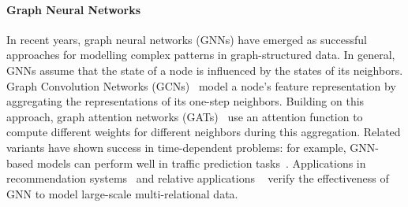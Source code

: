 \documentclass[letterpaper]{article} %
\begin{document}


\paragraph{Graph Neural Networks}
In recent years, graph neural networks (GNNs) have emerged as successful approaches for modelling complex patterns in graph-structured data.
In general, GNNs assume that the state of a node is influenced by the states of its neighbors. Graph Convolution Networks (GCNs)~\cite{gcn} model a node's feature representation by aggregating the representations of its one-step neighbors. Building on this approach, graph attention networks (GATs)~\cite{gat} use an attention function to compute different weights for different neighbors during this aggregation. 
Related variants have shown success in time-dependent problems: for example, GNN-based models can perform well in traffic prediction tasks~\cite{traffic_2,traffic_1}. Applications in recommendation systems~\cite{lim2020stp,relationalgcn} and relative applications ~\cite{wang2020detecting} verify the effectiveness of GNN to model large-scale multi-relational data.
\end{document}
